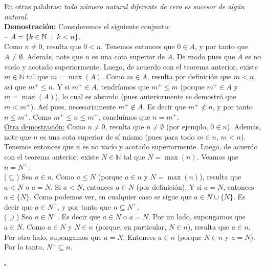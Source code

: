 \documentclass[10 pt]{article}
\begin{document}
\Large{En otras palabras: \textit{todo número natural diferente de cero es sucesor de algún natural}.} \\

\Large{\textbf{Demostración:} Consideremos el siguiente conjunto: \\

-- $A=\{k \in \mathbb N \hspace{0.2 cm}|\hspace{0.2 cm}k<n\}$. \\

Como $n \neq 0$, resulta que $0<n$. Tenemos entonces que $0 \in A$, y por tanto que $A \neq \emptyset$. Además, note que $n$ es una cota superior de $A$. De modo pues que $A$ es no vacío y acotado superiormente. Luego, de acuerdo con el teorema anterior, existe $m \in \mathbb N$ tal que $m=\max(A)$. Como $m \in A$, resulta por definición que $m<n$, así que $m^+ \leq n$. Y si $m^+ \in A$, tendríamos que $m^+ \leq m$ (porque $m^+ \in A$ y $m=\max(A)$), lo cual es absurdo (pues anteriormente se demostró que $m<m^+$). Así pues, necesariamente $m^+ \notin A$. Es decir que $m^+ \nless n$, y por tanto $n \leq m^+$. Como $m^+ \leq n \leq m^+$, concluimos que $n=m^+$. \\

\underline{Otra demostración:} Como $n \neq 0$, resulta que $n \neq \emptyset$ (por ejemplo, $0 \in n$). Además, note que $n$ es una cota superior de sí mismo (pues para todo $m \in n$, $m<n$). Tenemos entonces que $n$ es no vacío y acotado superiormente. Luego, de acuerdo con el teorema anterior, existe $N \in \mathbb N$ tal que $N=\max(n)$. Veamos que $n=N^+$: \\

($\subseteq$) Sea $a \in n$. Como $a \leq N$ (porque $a \in n$ y $N=\max(n)$), resulta que $a<N$ o $a=N$. Si $a<N$, entonces $a \in N$ (por definición). Y si $a=N$, entonces $a \in \{N\}$. Como podemos ver, en cualquier caso se sigue que $a \in N \cup \{N\}$. Es decir que $a \in N^+$, y por tanto que $n \subseteq N^+$. \\

($\supseteq$) Sea $a \in N^+$. Es decir que $a \in N$ o $a=N$. Por un lado, supongamos que $a \in N$. Como $a \in N$ y $N \in n$ (porque, en particular, $N \in n$), resulta que $a \in n$. Por otro lado, supongamos que $a=N$. Entonces $a \in n$ (porque $N \in n$ y $a=N$). Por lo tanto, $N^+ \subseteq n$.}\\
 
\begin{flushright}
    $\square$
\end{flushright}
\end{document}

